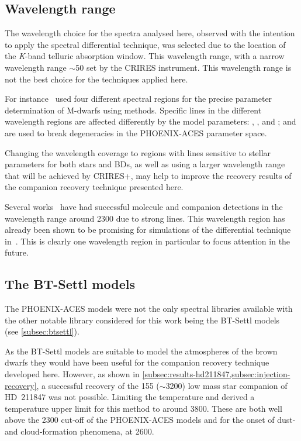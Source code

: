 \subsection {Wavelength range}
\label{subsec:wavelenght_range_limitation}
The wavelength choice for the spectra analysed here, observed with the intention to apply the spectral differential technique, was selected due to the location of the \emph{K}-band telluric absorption window.
This wavelength range, with a narrow wavelength range \(\sim\)50\nm{} set by the CRIRES instrument.
This wavelength range is not the best choice for the techniques applied here.

For instance~\citet{passegger_fundamental_2016} used four different spectral regions for the precise parameter determination of M-dwarfs using \textchisquared{} methods.
Specific lines in the different wavelength regions are affected differently by the model parameters: \Teff{}, \Logg{}, and \feh{}; and are used to break degeneracies in the {PHOENIX-ACES} parameter space.

Changing the wavelength coverage to regions with lines sensitive to stellar parameters for both stars and {BD}s, as well as using a larger wavelength range that will be achieved by {CRIRES+}, may help to improve the recovery results of the companion recovery technique presented here.

Several works~\citep[e.g.][]{brogi_carbon_2014, brogi_rotation_2016, piskorz_evidence_2016} have had successful molecule and companion detections in the wavelength range around 2300\nm{} due to strong  lines.
This wavelength region has already been shown to be promising for simulations of the differential technique in~\citet{kostogryz_spectral_2013}.
This is clearly one wavelength region in particular to focus attention in the future.


\subsection{The {BT-Settl} models}
\label{subsec:bt-settl}
The {PHOENIX-ACES} models were not the only spectral libraries available with the other notable library considered for this work being the {BT-Settl} models~\citep{allard_model_2010,allard_btsettl_2013,baraffe_new_2015} (see \cref{subsec:btsettl}).

As the {BT-Settl} models are suitable to model the atmospheres of the brown dwarfs they would have been useful for the companion recovery technique developed here.
However, as shown in \cref{subsec:results-hd211847,subsec:injection-recovery}, a successful recovery of the 155\Mjup{} (\Teff{}\(\sim\)3200\K{}) low mass star companion of {HD~211847} was not possible.
Limiting the temperature and derived a temperature upper limit for this method to around 3800\K{}.
These are both well above the 2300\K{} cut-off of the {PHOENIX-ACES} models and for the onset of dust- and cloud-formation phenomena, at 2600\K{}.

